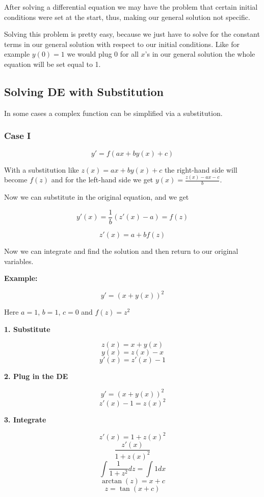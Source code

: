 After solving a differential equation we may have the problem that certain initial
conditions were set at the start, thus, making our general solution not specific.

Solving this problem is pretty easy, because we just have to solve for the constant terms
in our general solution with respect to our initial conditions. Like for example \(y(0) = 1\)
we would plug 0 for all \(x\)'s in our general solution the whole equation will be set equal to 1.

\subsection{Solving DE with Substitution}

In some cases a complex function can be simplified via a substitution.

\subsubsection{Case I}

\[
    y' = f(ax + by(x) + c)
\]

With a substitution like \(z(x) = ax + by(x) + c\) the right-hand side will become \(f(z)\)
and for the left-hand side we get \(y(x) = \frac{z(x) - ax - c}{b}\).

Now we can substitute in the original equation, and we get

\[
    y'(x) = \frac{1}{b} (z'(x) - a) = f(z)
\]

\[
    z'(x) = a + b f(z)
\]

Now we can integrate and find the solution and then return to our original variables.

\textbf{Example:}

\[
    y' = (x + y(x))^2
\]

Here \(a = 1\), \(b = 1\), \(c = 0\) and \(f(z) = z^2\)

\textbf{1. Substitute}

\[
    z(x) = x + y(x)
\]
\[
    y(x) = z(x) - x
\]
\[
    y'(x) = z'(x) - 1
\]

\textbf{2. Plug in the DE}

\[
    y' = {(x + y(x))}^2
\]
\[
    z'(x) - 1 = {z(x)}^2
\]

\textbf{3. Integrate}

\[
    z'(x) = 1 + {z(x)}^2
\]
\[
    \frac{z'(x)}{1 + {z(x)}^2}
\]
\[
    \int \frac{1}{1 + z^2} dz = \int 1 dx
\]
\[
    \arctan (z) = x + c
\]
\[
    z = \tan(x + c)
\]

